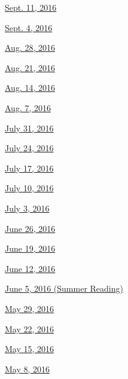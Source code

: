\href{http://www.nytimes.com/indexes/2016/09/18/todayspaper/index.html\#bookreview}{Sept.
11, 2016}

\href{http://www.nytimes.com/indexes/2016/09/04/todayspaper/index.html\#bookreview}{Sept.
4, 2016}

\href{http://www.nytimes.com/indexes/2016/08/28/todayspaper/index.html\#bookreview}{Aug.
28, 2016}

\href{http://www.nytimes.com/indexes/2016/08/21/todayspaper/index.html\#bookreview}{Aug.
21, 2016}

\href{http://www.nytimes.com/indexes/2016/08/14/todayspaper/index.html\#bookreview}{Aug.
14, 2016}

\href{http://www.nytimes.com/indexes/2016/08/07/todayspaper/index.html\#bookreview}{Aug.
7, 2016}

\href{http://www.nytimes.com/indexes/2016/07/31/todayspaper/index.html\#bookreview}{July
31, 2016}

\href{http://www.nytimes.com/indexes/2016/07/24/todayspaper/index.html\#bookreview}{July
24, 2016}

\href{http://www.nytimes.com/indexes/2016/07/17/todayspaper/index.html\#bookreview}{July
17, 2016}

\href{http://www.nytimes.com/indexes/2016/07/10/todayspaper/index.html\#bookreview}{July
10, 2016}

\href{http://www.nytimes.com/indexes/2016/07/03/todayspaper/index.html\#bookreview}{July
3, 2016}

\href{http://www.nytimes.com/indexes/2016/06/26/todayspaper/index.html\#bookreview}{June
26, 2016}

\href{http://www.nytimes.com/indexes/2016/06/19/todayspaper/index.html\#bookreview}{June
19, 2016}

\href{http://www.nytimes.com/indexes/2016/06/12/todayspaper/index.html\#bookreview}{June
12, 2016}

\href{http://www.nytimes.com/indexes/2016/06/05/todayspaper/index.html\#bookreview}{June
5, 2016 (Summer Reading)}

\href{http://www.nytimes.com/indexes/2016/05/29/todayspaper/index.html\#bookreview}{May
29, 2016}

\href{http://www.nytimes.com/indexes/2016/05/22/todayspaper/index.html\#bookreview}{May
22, 2016}

\href{http://www.nytimes.com/indexes/2016/05/15/todayspaper/index.html\#bookreview}{May
15, 2016}

\href{http://www.nytimes.com/indexes/2016/05/08/todayspaper/index.html\#bookreview}{May
8, 2016}

